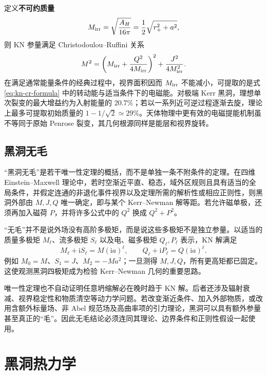 定义\textbf{不可约质量}
\begin{equation}\label{eq:kn-irreducible-mass}
    M_{\rm irr}=\sqrt{\frac{A_H}{16\pi}}
      =\frac12\sqrt{r_+^2+a^2},
\end{equation}
则 KN 参量满足 Christodoulou--Ruffini 关系
\begin{equation}\label{eq:kn-cr-formula}
    M^2=\left(M_{\rm irr}+\frac{Q^2}{4M_{\rm irr}}\right)^2
       +\frac{J^2}{4M_{\rm irr}^2}.
\end{equation}
在满足通常能量条件的经典过程中，视界面积因而 $M_{\rm irr}$ 不能减小，可提取的是式 \eqref{eq:kn-cr-formula} 中的转动能与适当条件下的电磁能。对极端 Kerr 黑洞，理想单次裂变的最大增益约为入射能量的 $20.7\%$；若以一系列近可逆过程逐渐去旋，理论上最多可提取初始质量的 $1-1/\sqrt2\simeq29\%$。天体物理中更有效的电磁提能机制虽不等同于原始 Penrose 裂变，其几何根源同样是能层和视界旋转。

\subsection{黑洞无毛}

“黑洞无毛”是若干唯一性定理的概括，而不是单独一条不附条件的定理。在四维 Einstein--Maxwell 理论中，若时空渐近平直、稳态，域外区规则且具有适当的全局条件，并假定连通的非退化事件视界以及定理所需的解析性或相应正则性，则黑洞外部由 $M,J,Q$ 唯一确定，即与某个 Kerr--Newman 解等距。若允许磁单极，还须再加入磁荷 $P$，并将许多公式中的 $Q^2$ 换成 $Q^2+P^2$。

“无毛”并不是说外场没有高阶多极矩，而是说这些多极矩不是独立参量。以适当的质量多极矩 $M_\ell$、流多极矩 $S_\ell$ 以及电、磁多极矩 $Q_\ell,P_\ell$ 表示，KN 解满足
\begin{equation}\label{eq:kn-multipoles}
    M_\ell+\mathrm{i}S_\ell=M(\mathrm{i}a)^\ell,
    \qquad
    Q_\ell+\mathrm{i}P_\ell=Q(\mathrm{i}a)^\ell .
\end{equation}
例如 $M_0=M$、$S_1=J$、$M_2=-Ma^2$；一旦测得 $M,J,Q$，所有更高矩都已固定。这使观测黑洞四极矩成为检验 Kerr--Newman 几何的重要思路。

唯一性定理也不自动证明任意坍缩解必在晚时趋于 KN 解。后者还涉及辐射衰减、视界稳定性和物质清空等动力学问题。若改变渐近条件、加入外部物质，或改用含额外标量场、非 Abel 规范场及高曲率项的引力理论，黑洞可以具有额外参量甚至真正的“毛”。因此无毛结论必须连同其理论、边界条件和正则性假设一起使用。

\section{黑洞热力学}\label{sec:bh-thermodynamics}

